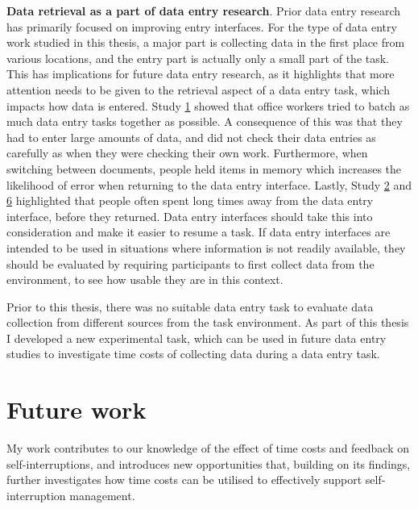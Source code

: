 \textbf{Data retrieval as a part of data entry research}. Prior data entry research has primarily focused on improving entry interfaces. For the type of data entry work studied in this thesis, a major part is collecting data in the first place from various locations, and the entry part is actually only a small part of the task. This has implications for future data entry research, as it highlights that more attention needs to be given to the retrieval aspect of a data entry task, which impacts how data is entered. Study \hyperref[st:Study1]{1} showed that office workers tried to batch as much data entry tasks together as possible. A consequence of this was that they had to enter large amounts of data, and did not check their data entries as carefully as when they were checking their own work. Furthermore, when switching between documents, people held items in memory which increases the likelihood of error when returning to the data entry interface. Lastly, Study \hyperref[st:Study2]{2} and \hyperref[st:Study6]{6} highlighted that people often spent long times away from the data entry interface, before they returned. Data entry interfaces should take this into consideration and make it easier to resume a task. If data entry interfaces are intended to be used in situations where information is not readily available, they should be evaluated by requiring participants to first collect data from the environment, to see how usable they are in this context.

Prior to this thesis, there was no suitable data entry task to evaluate data collection from different sources from the task environment. As part of this thesis I developed a new experimental task, which can be used in future data entry studies to investigate time costs of collecting data during a data entry task.

\section{Future work}
My work contributes to our knowledge of the effect of time costs and feedback on self-interruptions, and introduces new opportunities that, building on its findings, further investigates how time costs can be utilised to effectively support self-interruption management.



